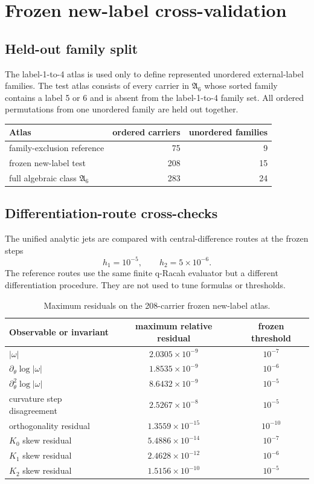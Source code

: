 \section{Frozen new-label cross-validation}
\subsection{Held-out family split}
The label-1-to-4 atlas is used only to define represented unordered external-label families.  The test atlas consists of every carrier in $\mathfrak A_6$ whose sorted family contains a label 5 or 6 and is absent from the label-1-to-4 family set.  All ordered permutations from one unordered family are held out together.

\begin{center}
\begin{tabular}{lrr}
\toprule
Atlas & ordered carriers & unordered families\\
\midrule
family-exclusion reference & 75 & 9\\
frozen new-label test & 208 & 15\\
full algebraic class $\mathfrak A_6$ & 283 & 24\\
\bottomrule
\end{tabular}
\end{center}

\subsection{Differentiation-route cross-checks}
The unified analytic jets are compared with central-difference routes at the frozen steps
\begin{equation}
h_1=10^{-5},
\qquad
h_2=5\times10^{-6}.
\label{eq:fdsteps}
\end{equation}
The reference routes use the same finite q-Racah evaluator but a different differentiation procedure.  They are not used to tune formulas or thresholds.

\begin{table}[ht]
\centering
\caption{Maximum residuals on the 208-carrier frozen new-label atlas.}
\label{tab:residuals}
\begin{tabular}{lcc}
\toprule
Observable or invariant & maximum relative residual & frozen threshold\\
\midrule
$|\omega|$ & $2.0305\times10^{-9}$ & $10^{-7}$\\
$\partial_\theta\log|\omega|$ & $1.8535\times10^{-9}$ & $10^{-6}$\\
$\partial_\theta^2\log|\omega|$ & $8.6432\times10^{-9}$ & $10^{-5}$\\
curvature step disagreement & $2.5267\times10^{-8}$ & $10^{-5}$\\
orthogonality residual & $1.3559\times10^{-15}$ & $10^{-10}$\\
$K_0$ skew residual & $5.4886\times10^{-14}$ & $10^{-7}$\\
$K_1$ skew residual & $2.4628\times10^{-12}$ & $10^{-6}$\\
$K_2$ skew residual & $1.5156\times10^{-10}$ & $10^{-5}$\\
\bottomrule
\end{tabular}
\end{table}

